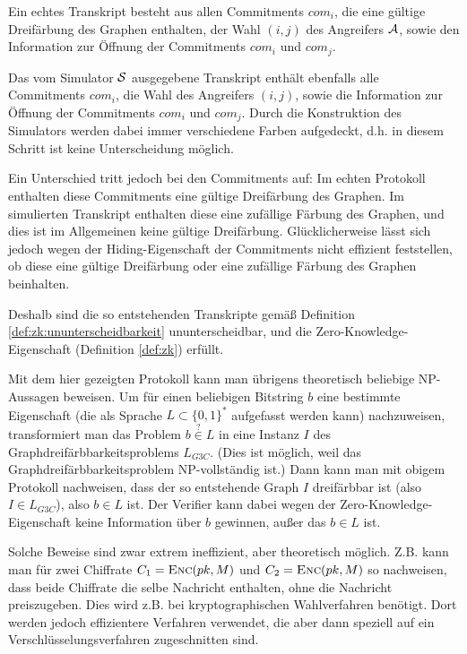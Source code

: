 Ein echtes Transkript besteht aus allen Commitments $com_i$, die eine
gültige Dreifärbung des Graphen enthalten, der Wahl $(i,j)$ des
Angreifers $\mathcal{A}$, sowie den Information zur Öffnung der Commitments
$com_i$ und $com_j$.

Das vom Simulator $\mathcal{S}$ ausgegebene Transkript enthält ebenfalls alle
Commitments $com_i$, die Wahl des Angreifers $(i,j)$, sowie die
Information zur Öffnung der Commitments $com_i$ und $com_j$. Durch die
Konstruktion des Simulators werden dabei immer verschiedene Farben
aufgedeckt, d.h. in diesem Schritt ist keine Unterscheidung möglich.

Ein Unterschied tritt jedoch bei den Commitments auf: Im echten
Protokoll enthalten diese Commitments eine gültige Dreifärbung des
Graphen. Im simulierten Transkript enthalten diese eine zufällige
Färbung des Graphen, und dies ist im Allgemeinen keine gültige
Dreifärbung.  Glücklicherweise lässt sich jedoch wegen der
Hiding-Eigenschaft der Commitments nicht effizient feststellen, ob diese
eine gültige Dreifärbung oder eine zufällige Färbung des Graphen
beinhalten.

Deshalb sind die so entstehenden Transkripte gemäß Definition
\ref{def:zk:ununterscheidbarkeit} ununterscheidbar, und die
Zero-Knowledge-Eigenschaft (Definition \ref{def:zk}) erfüllt.

Mit dem hier gezeigten Protokoll kann man übrigens theoretisch beliebige
NP-Aussagen beweisen.  Um für einen beliebigen Bitstring $b$ eine
bestimmte Eigenschaft (die als Sprache $L \subset \{0,1\}^*$ aufgefasst
werden kann) nachzuweisen, transformiert man das Problem $b
\stackrel{?}{\in} L$ in eine Instanz $I$ des
Graphdreifärbbarkeitsproblems $L_{G3C}$.  (Dies ist möglich, weil das
Graphdreifärbbarkeitsproblem NP-vollständig ist.)  Dann kann man mit
obigem Protokoll nachweisen, dass der so entstehende Graph $I$
dreifärbbar ist (also $I \in L_{G3C}$), also $b \in L$ ist.  Der
Verifier kann dabei wegen der Zero-Knowledge-Eigenschaft keine
Information über $b$ gewinnen, außer das $b \in L$ ist.

Solche Beweise sind zwar extrem ineffizient, aber theoretisch möglich.
Z.B. kann man für zwei Chiffrate $C_1 = \textsc{Enc}(pk, M)$ und
$C_2 = \textsc{Enc}(pk, M)$ so nachweisen, dass beide Chiffrate
die selbe Nachricht enthalten, ohne die Nachricht preiszugeben.  Dies
wird z.B. bei kryptographischen Wahlverfahren benötigt.  Dort werden
jedoch effizientere Verfahren verwendet, die aber dann speziell auf ein
Verschlüsselungsverfahren zugeschnitten sind.

